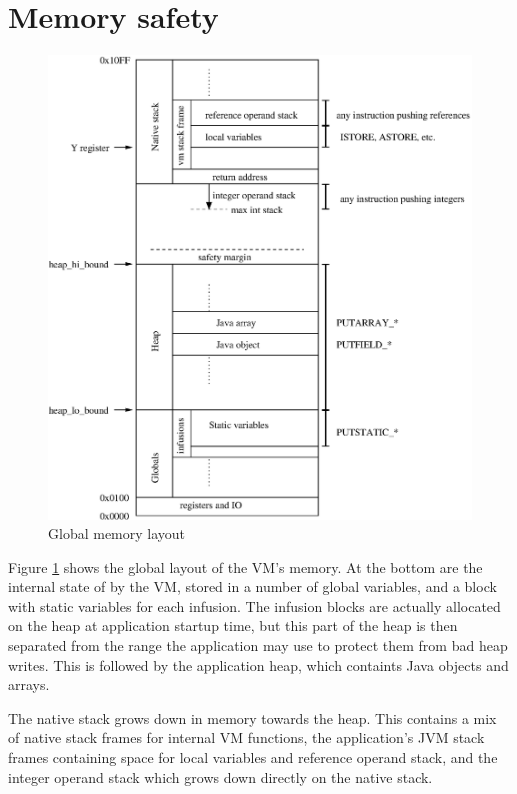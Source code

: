 \section{Memory safety}
\begin{figure}[]
  \includegraphics[width=\linewidth]{memlayout.eps}
  \caption{Global memory layout}
  \label{fig-memlayout}
\end{figure}

Figure \ref{fig-memlayout} shows the global layout of the VM's memory. At the bottom are the internal state of by the VM, stored in a number of global variables, and a block with static variables for each infusion. The infusion blocks are actually allocated on the heap at application startup time, but this part of the heap is then separated from the range the application may use to protect them from bad heap writes. This is followed by the application heap, which containts Java objects and arrays.

The native stack grows down in memory towards the heap. This contains a mix of native stack frames for internal VM functions, the application's JVM stack frames containing space for local variables and reference operand stack, and the integer operand stack which grows down directly on the native stack.

